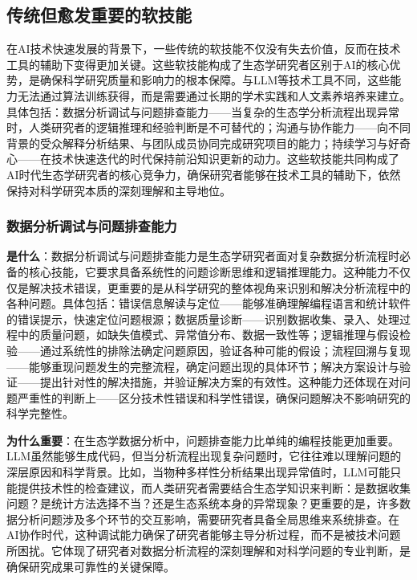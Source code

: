 \documentclass[
  twoside]{book}
\begin{document}
\hypertarget{ux4f20ux7edfux4f46ux6108ux53d1ux91cdux8981ux7684ux8f6fux6280ux80fd}{%
\subsection{传统但愈发重要的软技能}\label{ux4f20ux7edfux4f46ux6108ux53d1ux91cdux8981ux7684ux8f6fux6280ux80fd}}

在AI技术快速发展的背景下，一些传统的软技能不仅没有失去价值，反而在技术工具的辅助下变得更加关键。这些软技能构成了生态学研究者区别于AI的核心优势，是确保科学研究质量和影响力的根本保障。与LLM等技术工具不同，这些能力无法通过算法训练获得，而是需要通过长期的学术实践和人文素养培养来建立。具体包括：数据分析调试与问题排查能力------当复杂的生态学分析流程出现异常时，人类研究者的逻辑推理和经验判断是不可替代的；沟通与协作能力------向不同背景的受众解释分析结果、与团队成员协同完成研究项目的能力；持续学习与好奇心------在技术快速迭代的时代保持前沿知识更新的动力。这些软技能共同构成了AI时代生态学研究者的核心竞争力，确保研究者能够在技术工具的辅助下，依然保持对科学研究本质的深刻理解和主导地位。

\hypertarget{ux6570ux636eux5206ux6790ux8c03ux8bd5ux4e0eux95eeux9898ux6392ux67e5ux80fdux529b}{%
\subsubsection{数据分析调试与问题排查能力}\label{ux6570ux636eux5206ux6790ux8c03ux8bd5ux4e0eux95eeux9898ux6392ux67e5ux80fdux529b}}

\textbf{是什么}：数据分析调试与问题排查能力是生态学研究者面对复杂数据分析流程时必备的核心技能，它要求具备系统性的问题诊断思维和逻辑推理能力。这种能力不仅仅是解决技术错误，更重要的是从科学研究的整体视角来识别和解决分析流程中的各种问题。具体包括：错误信息解读与定位------能够准确理解编程语言和统计软件的错误提示，快速定位问题根源；数据质量诊断------识别数据收集、录入、处理过程中的质量问题，如缺失值模式、异常值分布、数据一致性等；逻辑推理与假设检验------通过系统性的排除法确定问题原因，验证各种可能的假设；流程回溯与复现------能够重现问题发生的完整流程，确定问题出现的具体环节；解决方案设计与验证------提出针对性的解决措施，并验证解决方案的有效性。这种能力还体现在对问题严重性的判断上------区分技术性错误和科学性错误，确保问题解决不影响研究的科学完整性。

\textbf{为什么重要}：在生态学数据分析中，问题排查能力比单纯的编程技能更加重要。LLM虽然能够生成代码，但当分析流程出现复杂问题时，它往往难以理解问题的深层原因和科学背景。比如，当物种多样性分析结果出现异常值时，LLM可能只能提供技术性的检查建议，而人类研究者需要结合生态学知识来判断：是数据收集问题？是统计方法选择不当？还是生态系统本身的异常现象？更重要的是，许多数据分析问题涉及多个环节的交互影响，需要研究者具备全局思维来系统排查。在AI协作时代，这种调试能力确保了研究者能够主导分析过程，而不是被技术问题所困扰。它体现了研究者对数据分析流程的深刻理解和对科学问题的专业判断，是确保研究成果可靠性的关键保障。
\end{document}
